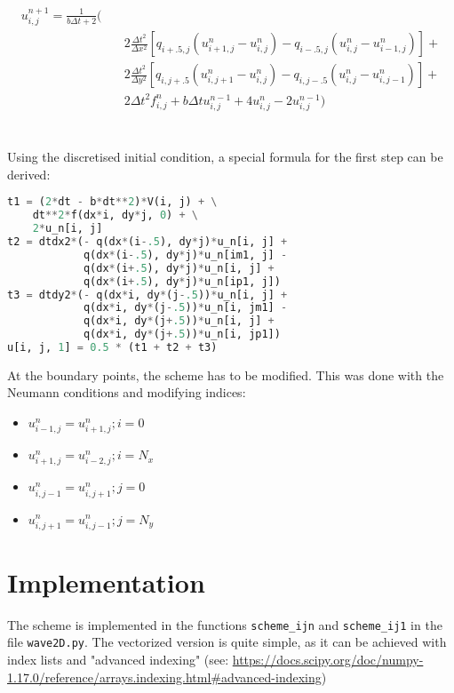 \documentclass{report}
\begin{document}
        \begin{equation}
        \begin{split}
        u^{n+1}_{i,j}= \frac{1}{b \Delta t + 2} (\\
        &\quad 2 \frac{\Delta t^2}{\Delta x^2}[q_{i+.5,j}(u^{n}_{i+1,j}-u^{n}_{i,j})-q_{i-.5,j}(u^{n}_{i,j}-u^{n}_{i-1,j})] + \\
        &\quad 2 \frac{\Delta t^2}{\Delta y^2}[q_{i,j+.5}(u^{n}_{i,j+1}-u^{n}_{i,j})-q_{i,j-.5}(u^{n}_{i,j}-u^{n}_{i,j-1})]+ \\
        &\quad 2\Delta t^2 f^{n}_{i,j} + b \Delta t u^{n-1}_{i,j}+4 u^{n}_{i,j}-2u^{n-1}_{i,j} )
        \end{split}
        \end{equation}
        \\ \\
        Using the discretised initial condition, a special formula for the first step can be derived:
        \begin{lstlisting}[language=Python]
t1 = (2*dt - b*dt**2)*V(i, j) + \
    dt**2*f(dx*i, dy*j, 0) + \
    2*u_n[i, j]
t2 = dtdx2*(- q(dx*(i-.5), dy*j)*u_n[i, j] +
            q(dx*(i-.5), dy*j)*u_n[im1, j] -
            q(dx*(i+.5), dy*j)*u_n[i, j] +
            q(dx*(i+.5), dy*j)*u_n[ip1, j])
t3 = dtdy2*(- q(dx*i, dy*(j-.5))*u_n[i, j] +
            q(dx*i, dy*(j-.5))*u_n[i, jm1] -
            q(dx*i, dy*(j+.5))*u_n[i, j] +
            q(dx*i, dy*(j+.5))*u_n[i, jp1])
u[i, j, 1] = 0.5 * (t1 + t2 + t3)
        \end{lstlisting}
        At the boundary points, the scheme has to be modified. This was done with the Neumann conditions and modifying indices:
        \begin{itemize}
        \item $u^{n}_{i-1,j}=u^{n}_{i+1,j}; i = 0$
        \item $u^{n}_{i+1,j}=u^{n}_{i-2,j}; i = N_x$
        \item $u^{n}_{i,j-1}=u^{n}_{i,j+1}; j = 0$
        \item $u^{n}_{i,j+1}=u^{n}_{i,j-1}; j = N_y$
        \end{itemize}
        
        
        \section*{Implementation}
        
        The scheme is implemented in the functions
        \texttt{scheme\_ijn}
        and \texttt{scheme\_ij1} in the file 
        \texttt{wave2D.py}.
        The vectorized version is quite simple, as it can be achieved with index lists and "advanced indexing" (see: \url{https://docs.scipy.org/doc/numpy-1.17.0/reference/arrays.indexing.html#advanced-indexing}{})
\end{document}

